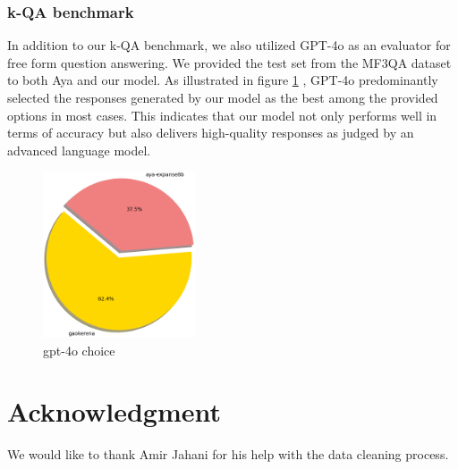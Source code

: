 \documentclass[conference]{IEEEtran}
\begin{document}
\subsubsection{k-QA benchmark}
In addition to our k-QA benchmark, we also utilized GPT-4o as an evaluator for free form question answering. We provided the test set from the MF3QA dataset to both Aya and our model. As illustrated in figure
\ref{fig2}
, GPT-4o predominantly selected the responses generated by our model as the best among the provided options in most cases. This indicates that our model not only performs well in terms of accuracy but also delivers high-quality responses as judged by an advanced language model.

\begin{figure}[htbp]
	\centerline{\includegraphics[width=0.4\textwidth]{fig2.png}}
	\caption{gpt-4o choice}
	\label{fig2}
\end{figure}
\section*{Acknowledgment}
We would like to thank Amir Jahani for his help with the data cleaning process.
\end{document}
